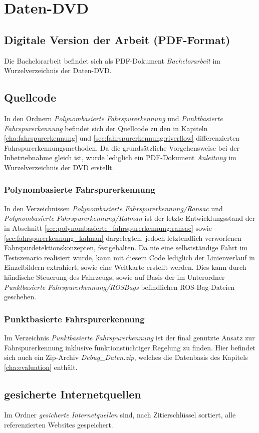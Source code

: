 \appendix
{} %
\newcommand{\fdname}[1]{\emph{#1}}
\chapter{Daten-DVD}	
\section{Digitale Version der Arbeit (PDF-Format)}
Die Bachelorarbeit befindet sich als PDF-Dokument \fdname{Bachelorarbeit} im Wurzelverzeichnis der Daten-DVD.

\section{Quellcode}
In den Ordnern \fdname{Polynombasierte Fahrspurerkennung} und \fdname{Punktbasierte Fahrspurerkennung} befindet sich der Quellcode zu den in Kapiteln \ref{cha:fahrspurerkennung} und \ref{sec:fahrspurerkennung:riverflow} differenzierten Fahrspurerkennungsmethoden. Da die grundsätzliche Vorgehensweise bei der Inbetriebnahme gleich ist, wurde lediglich ein PDF-Dokument \fdname{Anleitung} im Wurzelverzeichnis der DVD erstellt.

\subsection{Polynombasierte Fahrspurerkennung}
In den Verzeichnissen \fdname{Polynombasierte Fahrspurerkennung/Ransac} und \fdname{Polynombasierte Fahrspurerkennung/Kalman} ist der letzte Entwicklungsstand der in Abschnitt \ref{sec:polynombasierte_fahrspurerkennung:ransac} sowie \ref{sec:fahrspurerkennung_kalman} dargelegten, jedoch letztendlich verworfenen Fahrspurdetektionskonzepten, festgehalten. Da nie eine selbstständige Fahrt im Testszenario realisiert wurde, kann mit diesem Code lediglich der Linienverlauf in Einzelbildern extrahiert, sowie eine Weltkarte erstellt werden. Dies kann durch händische Steuerung des Fahrzeugs, sowie auf Basis der im Unterordner \fdname{Punktbasierte Fahrspurerkennung/ROSBags} befindlichen
ROS-Bag-Dateien geschehen.

\subsection{Punktbasierte Fahrspurerkennung}
\label{anhang:quellcode:punktbasierte}
Im Verzeichnis \fdname{Punktbasierte Fahrspurerkennung} ist der final genutzte Ansatz zur Fahrspurerkennung inklusive funktionstüchtiger Regelung zu finden. Hier befindet sich auch ein Zip-Archiv \fdname{Debug\_Daten.zip}, welches die Datenbasis des Kapitels \ref{cha:evaluation} enthält.

\section{gesicherte Internetquellen}
Im Ordner \fdname{gesicherte Internetquellen} sind, nach Zitierschlüssel sortiert, alle referenzierten Websites gespeichert.
